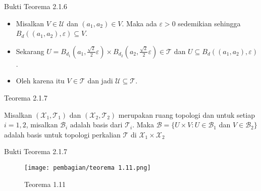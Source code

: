     
    \begin{frame}{Bukti Teorema 2.1.6}
    \begin{tcolorbox}[title=Bukti Teorema 2.1.6]
    \begin{itemize}
        \item Misalkan \( V \in \mathcal{U} \) dan \( (a_1, a_2) \in V \). Maka ada \( \varepsilon > 0 \) sedemikian sehingga \( B_d((a_1, a_2), \varepsilon) \subseteq V \). 
        \item Sekarang \( U = B_{d_1}(a_1, \frac{\sqrt{2}}{2} \varepsilon) \times B_{d_2}(a_2, \frac{\sqrt{2}}{2} \varepsilon) \in \mathcal{T} \) dan \( U \subseteq B_d((a_1, a_2), \varepsilon) \). 
        \item Oleh karena itu \( V \in \mathcal{T} \) dan jadi \( \mathcal{U} \subseteq \mathcal{T} \).
    \end{itemize}
           
    \end{tcolorbox}
    \end{frame}
    
    
    \begin{frame}{Teorema 2.1.7}
    \begin{tcolorbox}[title=Teorema 2.1.7]
        Misalkan $(\mathcal{X}_{1},\mathcal{T}_1)$ dan $(\mathcal{X}_{2},\mathcal{T}_2)$ merupakan ruang topologi dan untuk setiap $i = 1,2$, misalkan $\mathcal{B}_i$ adalah basis dari $\mathcal{T}_{i}$. Maka $\mathcal{B} = \{U \times V : U \in \mathcal{B}_1$ dan $V \in \mathcal{B}_2\}$ adalah basis untuk topologi perkalian $\mathcal{T}$ di $\mathcal{X}_1 \times \mathcal{X}_2$ 
    \end{tcolorbox}
    \end{frame}
    
    \begin{frame}{Bukti Teorema 2.1.7}
    
    \begin{figure}
        \centering
        \texttt{[image: pembagian/teorema 1.11.png]}
        \caption{Teorema 1.11}
        \label{fig:enter-label}
    \end{figure}
    
    
    \end{frame}
    
